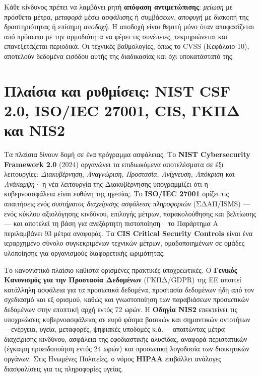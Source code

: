 \documentclass[11pt,openany]{book}
\begin{document}
Κάθε κίνδυνος πρέπει να λαμβάνει ρητή \textbf{απόφαση αντιμετώπισης}: \emph{μείωση} με πρόσθετα μέτρα, \emph{μεταφορά} μέσω ασφάλισης ή συμβάσεων, \emph{αποφυγή} με διακοπή της δραστηριότητας ή επίσημη \emph{αποδοχή}. Η αποδοχή είναι θεμιτή μόνο όταν αποφασίζεται από πρόσωπο με την αρμοδιότητα να φέρει τις συνέπειες, τεκμηριώνεται και επανεξετάζεται περιοδικά. Οι τεχνικές βαθμολογίες, όπως το CVSS (Κεφάλαιο 10), αποτελούν δεδομένα εισόδου αυτής της διαδικασίας και όχι υποκατάστατό της.

\section{Πλαίσια και ρυθμίσεις: NIST CSF 2.0, ISO/IEC 27001, CIS, ΓΚΠΔ και NIS2}\label{sec:13.4}
Τα πλαίσια δίνουν δομή σε ένα πρόγραμμα ασφάλειας. Το \textbf{NIST Cybersecurity Framework 2.0} (2024) οργανώνει τα επιδιωκόμενα αποτελέσματα σε έξι λειτουργίες: \emph{Διακυβέρνηση}, \emph{Αναγνώριση}, \emph{Προστασία}, \emph{Ανίχνευση}, \emph{Απόκριση} και \emph{Ανάκαμψη}· η νέα λειτουργία της Διακυβέρνησης υπογραμμίζει ότι η κυβερνοασφάλεια είναι ευθύνη της ηγεσίας. Το \textbf{ISO/IEC 27001} ορίζει τις απαιτήσεις ενός \emph{συστήματος διαχείρισης ασφάλειας πληροφοριών} (ΣΔΑΠ/ISMS) —ενός κύκλου αξιολόγησης κινδύνου, επιλογής μέτρων, παρακολούθησης και βελτίωσης— και αποτελεί τη βάση για ανεξάρτητη πιστοποίηση· το Παράρτημα Α περιλαμβάνει 93 μέτρα αναφοράς. Τα \textbf{CIS Critical Security Controls} είναι ένα ιεραρχημένο σύνολο συγκεκριμένων τεχνικών μέτρων, ομαδοποιημένων σε ομάδες υλοποίησης για οργανισμούς διαφορετικής ωριμότητας.

Το κανονιστικό πλαίσιο καθιστά ορισμένες πρακτικές υποχρεωτικές. Ο \textbf{Γενικός Κανονισμός για την Προστασία Δεδομένων} (ΓΚΠΔ/GDPR) της ΕΕ απαιτεί κατάλληλη ασφάλεια για τα προσωπικά δεδομένα, προστασία δεδομένων ήδη από τον σχεδιασμό και εξ ορισμού, καθώς και γνωστοποίηση των παραβιάσεων προσωπικών δεδομένων στην εποπτική αρχή εντός 72 ωρών. Η \textbf{Οδηγία NIS2} επεκτείνει τις υποχρεώσεις κυβερνοασφάλειας σε ευρύ φάσμα βασικών και σημαντικών οντοτήτων —ενέργεια, υγεία, μεταφορές, ψηφιακές υποδομές κ.ά.— απαιτώντας μέτρα διαχείρισης κινδύνου, ασφάλεια της εφοδιαστικής αλυσίδας, αναφορά περιστατικών (έγκαιρη προειδοποίηση εντός 24 ωρών) και προσωπική λογοδοσία των διοικητικών οργάνων. Στις Ηνωμένες Πολιτείες, ο νόμος \textbf{HIPAA} επιβάλλει ανάλογες διασφαλίσεις για τις πληροφορίες υγείας.
\end{document}
